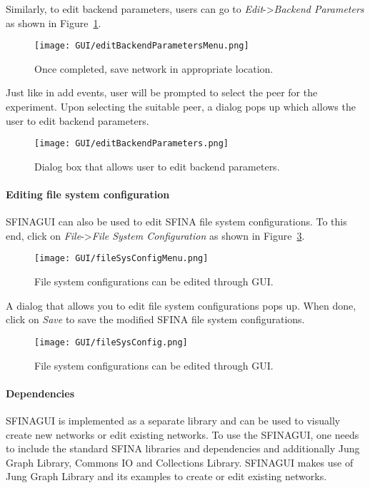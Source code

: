 \documentclass[11pt,fleqn]{book} %
\begin{document}
Similarly, to edit backend parameters, users can go to \textit{Edit}->\textit{Backend Parameters} as shown in Figure~\ref{fig:editbackendparametersmenu}.
\begin{figure}[H]
	\centering
	\texttt{[image: GUI/editBackendParametersMenu.png]}
	\caption{Once completed, save network in appropriate location.}\label{fig:editbackendparametersmenu}
\end{figure}
Just like in add events, user will be prompted to select the peer for the  experiment. Upon selecting the suitable peer, a dialog pops up which allows the user to edit backend parameters.
\begin{figure}[H]
	\centering
	\texttt{[image: GUI/editBackendParameters.png]}
	\caption{Dialog box that allows user to edit backend parameters.}\label{fig:editbackendparameters}
\end{figure}

\paragraph{Editing file system configuration}
SFINAGUI can also be used to edit SFINA file system configurations. To this end, click on \textit{File}->\textit{File System Configuration} as shown in Figure~\ref{fig:filesysconfigmenu}.

\begin{figure}[H]
	\centering
	\texttt{[image: GUI/fileSysConfigMenu.png]}
	\caption{File system configurations can be edited through GUI.}\label{fig:filesysconfigmenu}
\end{figure}

A dialog that allows you to edit file system configurations pops up. When done, click on \textit{Save} to save the modified SFINA file system configurations.

\begin{figure}[H]
	\centering
	\texttt{[image: GUI/fileSysConfig.png]}
	\caption{File system configurations can be edited through GUI.}\label{fig:filesysconfig}
\end{figure}

\paragraph{Dependencies} SFINAGUI is implemented as a separate library and can be used to visually create new networks or edit existing networks. To use the SFINAGUI, one needs to include the standard SFINA libraries and dependencies and additionally Jung Graph Library, Commons IO and Collections Library. SFINAGUI makes use of Jung Graph Library and its examples to create or edit existing networks.
\end{document}
